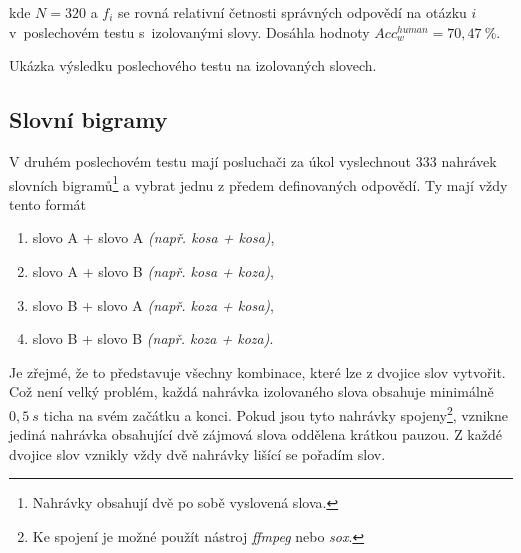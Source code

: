 \noindent kde $N=320$ a $f_i$ se rovná relativní četnosti správných odpovědí na otázku $i$ v~poslechovém testu s~izolovanými slovy. Dosáhla hodnoty $Acc_w^{human} = 70,47~\%$.

\begin{table}[htpb]
  \centering
  \def\arraystretch{1.5}
  \caption{Ukázka výsledku poslechového testu na izolovaných slovech.}
  \label{tab:realisation:listening:isolated}
\end{table}

\subsection{Slovní bigramy}
\label{chap:realisation:listening:bigrams}

V druhém poslechovém testu mají posluchači za úkol vyslechnout $333$ nahrávek slovních bigramů\footnote{Nahrávky obsahují dvě po sobě vyslovená slova.} a vybrat jednu z předem definovaných odpovědí. Ty mají vždy tento formát

\begin{enumerate}[label=\alph*)]
  \item slovo A + slovo A \textit{(např. kosa + kosa)},
  \item slovo A + slovo B \textit{(např. kosa + koza)},
  \item slovo B + slovo A \textit{(např. koza + kosa)},
  \item slovo B + slovo B \textit{(např. koza + koza)}.
\end{enumerate}

\noindent Je zřejmé, že to představuje všechny kombinace, které lze z dvojice slov vytvořit.
Což není velký problém, každá nahrávka izolovaného slova obsahuje minimálně $0,5\ s$ ticha na svém začátku a konci. Pokud jsou tyto nahrávky spojeny\footnote{Ke spojení je možné použít nástroj \textit{ffmpeg} nebo \textit{sox}.}, vznikne jediná nahrávka obsahující dvě zájmová slova oddělena krátkou pauzou. Z každé dvojice slov vznikly vždy dvě nahrávky lišící se pořadím slov.

